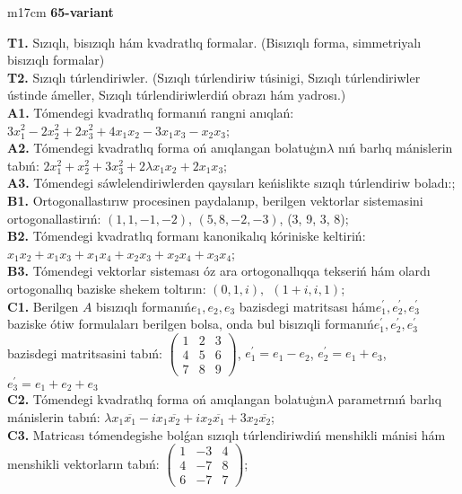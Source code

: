 \documentclass{article}
\begin{document}
\begin{tabular}{m{17cm}}
\textbf{65-variant}
\newline

\textbf{T1.} Sızıqlı, bisızıqlı hám kvadratlıq formalar. (Bisızıqlı forma,  simmetriyalı bisızıqlı formalar)  \\
\textbf{T2.} Sızıqlı túrlendiriwler.  (Sızıqlı túrlendiriw túsinigi, Sızıqlı túrlendiriwler ústinde ámeller, Sızıqlı túrlendiriwlerdiń obrazı hám yadrosı.) \\
\textbf{A1.} Tómendegi kvadratlıq formanıń rangni anıqlań: \(3x_{1}^{2} - 2x_{2}^{2} + 2x_{3}^{2} + 4x_{1}x_{2} - 3x_{1}x_{3} - x_{2}x_{3}\); \\
\textbf{A2.} Tómendegi kvadratlıq forma oń anıqlangan bolatuģın\(\lambda\) nıń barlıq mánislerin tabıń: \(2x_{1}^{2} + x_{2}^{2} + 3x_{3}^{2} + 2\lambda x_{1}x_{2} + 2x_{1}x_{3}\); \\
\textbf{A3.} Tómendegi sáwlelendiriwlerden qaysıları keńislikte sızıqlı túrlendiriw boladı:; \\
\textbf{B1.} Ortogonallastırıw procesinen paydalanıp, berilgen vektorlar sistemasini ortogonallastirıń: \((1,1, - 1, - 2)\), \((5,8, - 2, - 3)\), (3, 9, 3, 8); \\
\textbf{B2.} Tómendegi kvadratlıq formanı kanonikalıq kóriniske keltiriń: \(x_{1}x_{2} + x_{1}x_{3} + x_{1}x_{4} + x_{2}x_{3} + x_{2}x_{4} + x_{3}x_{4}\); \\
\textbf{B3.} Tómendegi vektorlar sisteması óz ara ortogonallıqqa tekseriń hám olardı ortogonallıq baziske shekem toltırın: \((0,1,i),\ \ (1 + i,i,1)\); \\
\textbf{C1.} Berilgen \(A\) bisızıqlı formanıń\(e_{1},e_{2},e_{3}\) bazisdegi matritsası hám\(e_{1}^{'},e_{2}^{'},e_{3}^{'}\) baziske ótiw formulaları berilgen bolsa, onda bul bisızıqli formanıń\(e_{1}^{'},e_{2}^{'},e_{3}^{'}\) bazisdegi matritsasini tabıń: \(\begin{pmatrix} 1 & 2 & 3 \\ 4 & 5 & 6 \\ 7 & 8 & 9 \end{pmatrix}\), \(e_{1}^{'} = e_{1} - e_{2}\), \(e_{2}^{'} = e_{1} + e_{3}\), \(e_{3}^{'} = e_{1} + e_{2} + e_{3}\) \\
\textbf{C2.} Tómendegi kvadratlıq forma oń anıqlangan bolatuģın\(\lambda\) parametrnıń barlıq mánislerin tabıń: \(\lambda x_{1}\overline{x_{1}} - ix_{1}\overline{x_{2}} + ix_{2}\overline{x_{1}} + 3x_{2}\overline{x_{2}}\); \\
\textbf{C3.} Matricası tómendegishe bolǵan sızıqlı túrlendiriwdiń menshikli mánisi hám menshikli vektorların tabıń: \(\begin{pmatrix} 1 & - 3 & 4 \\ 4 & - 7 & 8 \\ 6 & - 7 & 7 \end{pmatrix}\); \\

\end{tabular}
\vspace{1cm}
\end{document}
